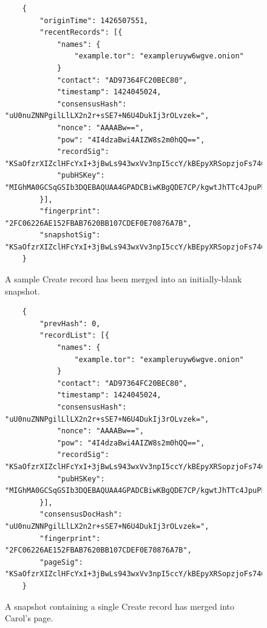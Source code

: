 \begin{figure}
	\begin{lstlisting}
	{
		"originTime": 1426507551,
		"recentRecords": [{
			"names": {
				"example.tor": "exampleruyw6wgve.onion"
			}
			"contact": "AD97364FC20BEC80",
			"timestamp": 1424045024,
			"consensusHash": "uU0nuZNNPgilLlLX2n2r+sSE7+N6U4DukIj3rOLvzek=",
			"nonce": "AAAABw==",
			"pow": "4I4dzaBwi4AIZW8s2m0hQQ==",
			"recordSig": 	"KSaOfzrXIZclHFcYxI+3jBwLs943wxVv3npI5ccY/kBEpyXRSopzjoFs746n0tJqUpdY4Kbe6DBwERaN7ELmSSK9Pu6q8QeKzNAh+QOnKl0fKBN7fqowjkQ3ktFkR0Vuox9WrrbNTMa4+up0Np52hlbKA3zSRz4fbR9NVlh6uuQ=",
			"pubHSKey": "MIGhMA0GCSqGSIb3DQEBAQUAA4GPADCBiwKBgQDE7CP/kgwtJhTTc4JpuPkvA7Ln9wgc+fgTKgkyUp1zusxgUAn1c1MGx4YhO42KPB7dyZOf3pcRk94XsYFY1ULkF2+tf9KdNe7GFzJyMFCQENnUcVXbcwLH4vAeiGK7R/nScbCbyc9LT+VE1fbKchTL1QzLVBLqJTxhR+9YPi8x+QIFAdZ8BJs="
		}],
		"fingerprint": "2FC06226AE152FBAB7620BB107CDEF0E70876A7B",
		"snapshotSig": "KSaOfzrXIZclHFcYxI+3jBwLs943wxVv3npI5ccY/kBEpyXRSopzjoFs746n0tJqUpdY4Kbe6DBwERaN7ELmSSK9Pu6q8QeKzNAh+QOnKl0fKBN7fqowjkQ3ktFkR0Vuox9WrrbNTMa4+up0Np52hlbKA3zSRz4fbR9NVlh6uuQ="
	}
	\end{lstlisting}
	\caption{A sample Create record has been merged into an initially-blank snapshot.}
	\label{fig:recordInSS}
\end{figure}

\begin{figure}
	\begin{lstlisting}
	{
		"prevHash": 0,
		"recordList": [{
			"names": {
				"example.tor": "exampleruyw6wgve.onion"
			}
			"contact": "AD97364FC20BEC80",
			"timestamp": 1424045024,
			"consensusHash": "uU0nuZNNPgilLlLX2n2r+sSE7+N6U4DukIj3rOLvzek=",
			"nonce": "AAAABw==",
			"pow": "4I4dzaBwi4AIZW8s2m0hQQ==",
			"recordSig": 	"KSaOfzrXIZclHFcYxI+3jBwLs943wxVv3npI5ccY/kBEpyXRSopzjoFs746n0tJqUpdY4Kbe6DBwERaN7ELmSSK9Pu6q8QeKzNAh+QOnKl0fKBN7fqowjkQ3ktFkR0Vuox9WrrbNTMa4+up0Np52hlbKA3zSRz4fbR9NVlh6uuQ=",
			"pubHSKey": "MIGhMA0GCSqGSIb3DQEBAQUAA4GPADCBiwKBgQDE7CP/kgwtJhTTc4JpuPkvA7Ln9wgc+fgTKgkyUp1zusxgUAn1c1MGx4YhO42KPB7dyZOf3pcRk94XsYFY1ULkF2+tf9KdNe7GFzJyMFCQENnUcVXbcwLH4vAeiGK7R/nScbCbyc9LT+VE1fbKchTL1QzLVBLqJTxhR+9YPi8x+QIFAdZ8BJs="
		}],
		"consensusDocHash": "uU0nuZNNPgilLlLX2n2r+sSE7+N6U4DukIj3rOLvzek=",
		"fingerprint": "2FC06226AE152FBAB7620BB107CDEF0E70876A7B",
		"pageSig": "KSaOfzrXIZclHFcYxI+3jBwLs943wxVv3npI5ccY/kBEpyXRSopzjoFs746n0tJqUpdY4Kbe6DBwERaN7ELmSSK9Pu6q8QeKzNAh+QOnKl0fKBN7fqowjkQ3ktFkR0Vuox9WrrbNTMa4+up0Np52hlbKA3zSRz4fbR9NVlh6uuQ="
	}
	\end{lstlisting}
	\caption{A snapshot containing a single Create record has merged into Carol's page.}
\end{figure}













